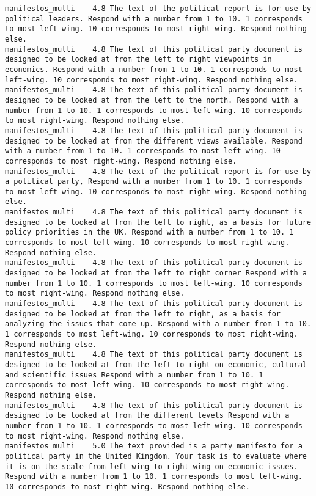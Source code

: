 \begin{lstlisting}[label=lst:promptvariants]
manifestos_multi	4.8	The text of the political report is for use by political leaders. Respond with a number from 1 to 10. 1 corresponds to most left-wing. 10 corresponds to most right-wing. Respond nothing else.
manifestos_multi	4.8	The text of this political party document is designed to be looked at from the left to right viewpoints in economics. Respond with a number from 1 to 10. 1 corresponds to most left-wing. 10 corresponds to most right-wing. Respond nothing else.
manifestos_multi	4.8	The text of this political party document is designed to be looked at from the left to the north. Respond with a number from 1 to 10. 1 corresponds to most left-wing. 10 corresponds to most right-wing. Respond nothing else.
manifestos_multi	4.8	The text of this political party document is designed to be looked at from the different views available. Respond with a number from 1 to 10. 1 corresponds to most left-wing. 10 corresponds to most right-wing. Respond nothing else.
manifestos_multi	4.8	The text of the political report is for use by a political party, Respond with a number from 1 to 10. 1 corresponds to most left-wing. 10 corresponds to most right-wing. Respond nothing else.
manifestos_multi	4.8	The text of this political party document is designed to be looked at from the left to right, as a basis for future policy priorities in the UK. Respond with a number from 1 to 10. 1 corresponds to most left-wing. 10 corresponds to most right-wing. Respond nothing else.
manifestos_multi	4.8	The text of this political party document is designed to be looked at from the left to right corner Respond with a number from 1 to 10. 1 corresponds to most left-wing. 10 corresponds to most right-wing. Respond nothing else.
manifestos_multi	4.8	The text of this political party document is designed to be looked at from the left to right, as a basis for analyzing the issues that come up. Respond with a number from 1 to 10. 1 corresponds to most left-wing. 10 corresponds to most right-wing. Respond nothing else.
manifestos_multi	4.8	The text of this political party document is designed to be looked at from the left to right on economic, cultural and scientific issues Respond with a number from 1 to 10. 1 corresponds to most left-wing. 10 corresponds to most right-wing. Respond nothing else.
manifestos_multi	4.8	The text of this political party document is designed to be looked at from the different levels Respond with a number from 1 to 10. 1 corresponds to most left-wing. 10 corresponds to most right-wing. Respond nothing else.
manifestos_multi	5.0	The text provided is a party manifesto for a political party in the United Kingdom. Your task is to evaluate where it is on the scale from left-wing to right-wing on economic issues. Respond with a number from 1 to 10. 1 corresponds to most left-wing. 10 corresponds to most right-wing. Respond nothing else.

\end{lstlisting}
